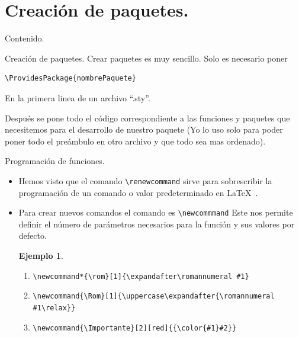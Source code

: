 \documentclass[dvipsnames,xcolor=x11names, handout]{beamer}
\newcommand*{\rom}[1]{\expandafter\romannumeral #1}
\newcommand{\Rom}[1]{\uppercase\expandafter{\romannumeral #1\relax}}
\newcommand{\Importante}[2]{{\color{#1}#2}}
\theoremstyle{plain}
\theoremstyle{definition}
\newtheorem{ejemplo}{Ejemplo}
\begin{document}
\section{Creación de paquetes.}
\begin{frame}{Contenido.}
  \tableofcontents[currentsection]
\end{frame}
\begin{frame}[fragile]{Creación de paquetes.}
Crear paquetes es muy sencillo. \pause Solo es necesario poner 
    
\begin{verbatim}
\ProvidesPackage{nombrePaquete}
\end{verbatim}

En la primera linea de un archivo ``.sty''.\pause

Después se pone todo el código correspondiente a las funciones y paquetes que necesitemos para el desarrollo de nuestro paquete (Yo lo uso solo para poder poner todo el preámbulo en otro archivo y que todo sea mas ordenado). 
\end{frame}

\begin{frame}[fragile]{Programación de funciones.}
\begin{itemize}[<+->]
    \item Hemos visto que el comando \verb!\renewcommand! sirve para sobrescribir la programación de un comando o valor predeterminado en \LaTeX\ .
    \item Para crear nuevos comandos el comando es \verb!\newcommmand! Este nos permite definir el número de parámetros necesarios para la función y sus valores por defecto.\pause
    \begin{ejemplo}
    \begin{enumerate}[<+->]
    \item \verb!\newcommand*{\rom}[1]{\expandafter\romannumeral #1}!
    \item \scriptsize{\verb!\newcommand{\Rom}[1]{\uppercase\expandafter{\romannumeral #1\relax}}!}
    \item \verb!\newcommand{\Importante}[2][red]{{\color{#1}#2}}!
    \end{enumerate}
    \end{ejemplo}
\end{itemize}
\end{frame}
\end{document}
